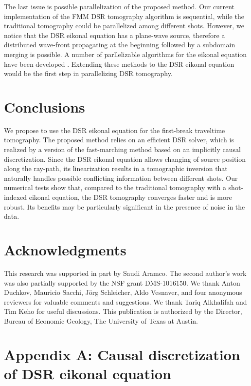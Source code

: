 The last issue is possible parallelization of the proposed method. Our current 
implementation of the FMM DSR tomography algorithm is sequential, while the traditional tomography could be 
parallelized among different shots. However, we notice that the DSR eikonal equation has a plane-wave source, 
therefore a distributed wave-front propagating at the beginning followed by a subdomain merging is possible. A 
number of parllelizable algorithms for the eikonal equation have been developed 
\cite[]{zhao1,jeong,weber,chacon2,detrixhe}. Extending these methods to the DSR eikonal equation would be the 
first step in parallelizing DSR tomography.

\section{Conclusions}

We propose to use the DSR eikonal equation for the first-break traveltime tomography. 
The proposed method relies on an efficient DSR solver, which is realized by a version of the fast-marching method 
based on an implicitly causal discretization. Since the DSR eikonal equation allows changing of source position 
along the ray-path, its linearization results in a tomographic inversion that naturally handles possible 
conflicting information between different shots. Our numerical tests show that, compared to 
the traditional tomography with a shot-indexed eikonal equation, the DSR tomography converges faster and is more 
robust. Its benefits may be particularly significant in the presence of noise in the data. 

\section{Acknowledgments}

This research was supported in part by Saudi Aramco. The second author's work was also partially supported by the 
NSF grant DMS-1016150. We thank Anton Duchkov, Mauricio Sacchi, J\"{o}rg Schleicher, Aldo Vesnaver, and four 
anonymous reviewers for valuable comments and suggestions. We thank Tariq Alkhalifah and Tim Keho for useful 
discussions. This publication is authorized by the Director, Bureau of Economic Geology, The University of Texas 
at Austin.

\appendix
\section{Appendix A: Causal discretization of DSR eikonal equation}

